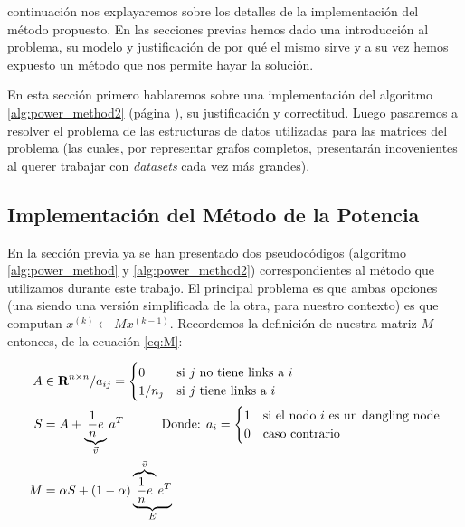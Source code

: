 \par {} continuaci\'on nos explayaremos sobre los detalles de la
implementaci\'on del m\'etodo propuesto. En las secciones previas hemos dado una
introducci\'on al problema, su modelo y justificaci\'on de por qué el mismo sirve
y a su vez hemos expuesto un m\'etodo que nos permite hayar la soluci\'on.

\par En esta secci\'on primero hablaremos sobre una implementaci\'on del
algoritmo \ref{alg:power_method2} (p\'agina \pageref{alg:power_method2}), su
justificaci\'on y correctitud. Luego pasaremos a resolver el problema de las
estructuras de datos utilizadas para las matrices del problema (las cuales, por
representar grafos completos, presentar\'an incovenientes al querer trabajar
con \emph{datasets} cada vez m\'as grandes).

\subsection{Implementaci\'on del M\'etodo de la Potencia}
\par En la secci\'on previa ya se han presentado dos pseudoc\'odigos (algoritmo
\ref{alg:power_method} y \ref{alg:power_method2}) correspondientes al m\'etodo
que utilizamos durante este trabajo. El principal problema es que ambas opciones
(una siendo una versi\'on simplificada de la otra, para nuestro contexto) es que
computan $x^{(k)} \gets Mx^{(k-1)}$. Recordemos la definici\'on de nuestra
matriz $M$ entonces, de la ecuaci\'on \ref{eq:M}:

\begin{align}
    A &\in\real^{n\times n} / a_{ij} =
        \begin{cases}
            0       &\text{si $j$ no tiene links a $i$}\\
            1/n_j   &\text{si $j$ tiene links a $i$}
        \end{cases}\label{eq:A2}\\
    S &= A + \underbrace{\dfrac{1}{n}e}_{\vec{v}}a^T \quad\quad\quad
        \text{Donde: } a_i =
        \begin{cases}
            1 &\text{si el nodo $i$ es un dangling node}\\
            0 &\text{caso contrario}
        \end{cases}\label{eq:S2}\\
    M &= \alpha S + (1-\alpha)\underbrace{\overbrace{\dfrac{1}{n}e}^{\vec{v}}e^T}_E
    \label{eq:M2}
\end{align}

